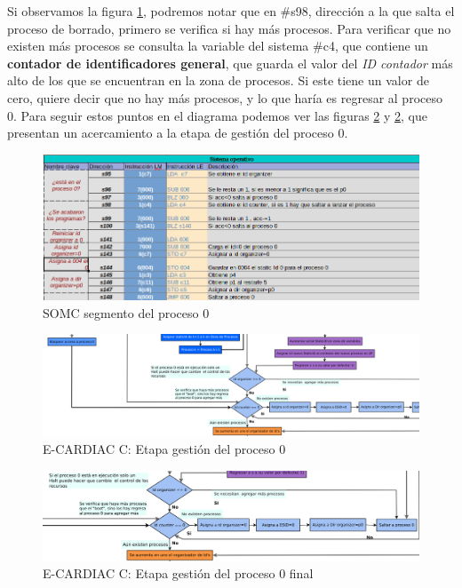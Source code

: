 \documentclass[letterpaper,12pt,oneside]{book}
\begin{document}
	   
		Si observamos  la figura \ref{fig:somcNuceloP0}, podremos notar que en \#s98, dirección a la que salta el proceso de borrado, primero 
		se verifica si hay 
		más procesos. Para verificar que no existen más procesos
		se consulta la variable del sistema \#c4, que contiene un \textbf{contador de identificadores general}, que guarda el valor del 
		\textit{ID contador} más alto de los que
		se encuentran en la zona de procesos. Si este tiene un valor de cero, quiere decir que no hay más procesos, y lo que haría es regresar al 
		proceso 0.  Para seguir estos puntos en el diagrama podemos ver las figuras \ref{fig:somcEtapaAzulClaro} y \ref{fig:somcEtapaAzulClaro},
		que presentan un acercamiento a la etapa de gestión del proceso 0.

        \begin{figure}[H]		
			\centering
			\includegraphics[scale=0.53]{media/CARDIACC/SO_Proceso0.png}
			\caption{ SOMC segmento del proceso 0}
			\label{fig:somcNuceloP0}
		\end{figure}
		
		\begin{figure}[h]		
			\centering
			\includegraphics[scale=0.33]{media/CARDIACC/diagEtapaAzulClaro.png}
			\caption{ E-CARDIAC C: Etapa gestión del proceso 0}
			\label{fig:somcEtapaAzulClaro}
		\end{figure}
		
		\begin{figure}[h]		
			\centering
			\includegraphics[scale=0.4]{media/CARDIACC/diagEtapaAzulClaro2.png}
			\caption{ E-CARDIAC C: Etapa gestión del proceso 0 final}
			\label{fig:somcEtapaAzulClaro2}
		\end{figure}
\end{document}
